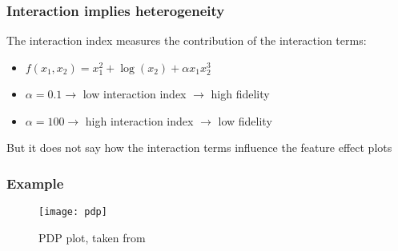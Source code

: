 \begin{frame}
  \frametitle{Interaction implies heterogeneity}
  The interaction index measures the contribution of the interaction terms:

  \begin{itemize}
    \item \(f(x_1, x_2) = x_1^2 + \log(x_2) + \alpha x_1x_2^3\)
    \item \(\alpha = 0.1 \rightarrow\) low interaction index \(\rightarrow\) high fidelity
    \item \(\alpha = 100 \rightarrow\) high interaction index \(\rightarrow\) low fidelity
    \end{itemize}
  \noindent\makebox[\linewidth]{\rule{\paperwidth}{0.4pt}}
  But it does not say how the interaction terms influence the feature effect plots
\end{frame}

\begin{frame}
  \frametitle{Example}
  \begin{figure}
    \centering
    \texttt{[image: pdp]}
    \caption{PDP plot, taken from }
  \end{figure}
\end{frame}
